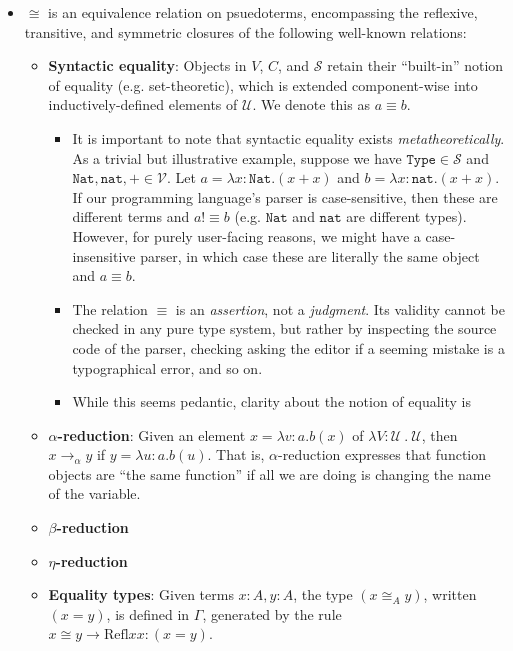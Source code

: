 \begin{definition}
\begin{itemize}
            \item $\cong$ is an equivalence relation on psuedoterms, encompassing the reflexive, transitive, and symmetric closures of the following well-known relations:
            \begin{itemize}
                \item \textbf{Syntactic equality}: Objects in $V$, $C$, and $\mathcal{S}$ retain their ``built-in'' notion of equality (e.g. set-theoretic), which is extended component-wise into inductively-defined elements of $\mathcal{U}$. We denote this as $a \equiv b$.
                \begin{itemize}
                    \item It is important to note that syntactic equality exists \emph{metatheoretically}. As a trivial but illustrative example, suppose we have $\texttt{Type} \in \mathcal{S}$ and $\texttt{Nat},\texttt{nat},+ \in \mathcal{V}$. Let $a = \lambda x:\texttt{Nat} . (x + x)$ and $b = \lambda x: \texttt{nat} . (x + x)$. If our programming language's parser is case-sensitive, then these are different terms and $a !\equiv b$ (e.g. $\texttt{Nat}$ and $\texttt{nat}$ are different types). However, for purely user-facing reasons, we might have a case-insensitive parser, in which case these are literally the same object and $a \equiv b$.
                    \item The relation $\equiv$ is an \emph{assertion}, not a \emph{judgment}. Its validity cannot be checked in any pure type system, but rather by inspecting the source code of the parser, checking  asking the editor if a seeming mistake is a typographical error, and so on.
                    \item While this seems pedantic, clarity about the notion of equality is %
                \end{itemize} 
                \item \textbf{$\alpha$-reduction}: Given an element $x = \lambda v : a . b(x)$ of $\lambda V : \mathcal{U}\ .\ \mathcal{U}$, then $x \rightarrow_{\alpha} y$ if $y = \lambda u : a . b(u)$. That is, $\alpha$-reduction expresses that function objects are ``the same function'' if all we are doing is changing the name of the variable.
                \item \textbf{$\beta$-reduction}
                \item \textbf{$\eta$-reduction}
                \item \textbf{Equality types}: Given terms $x : A, y : A$, the type $(x \cong_A y)$, written $(x = y)$, is defined in $\Gamma$, generated by the rule $x \cong y \rightarrow \mathrm{Refl} x x : (x = y)$.
            \end{itemize}
    \end{itemize}
\end{definition}

